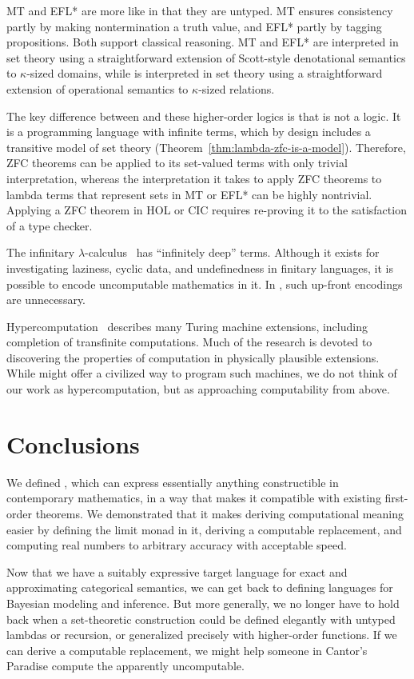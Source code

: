 MT and EFL* are more like \targetlang in that they are untyped. MT ensures consistency partly by making nontermination a truth value, and EFL* partly by tagging propositions.
Both support classical reasoning.
MT and EFL* are interpreted in set theory using a straightforward extension of Scott-style denotational semantics to $\kappa$-sized domains, while \targetlang is interpreted in set theory using a straightforward extension of operational semantics to $\kappa$-sized relations.

The key difference between \targetlang and these higher-order logics is that \targetlang is not a logic. It is a programming language with infinite terms, which by design includes a transitive model of set theory (Theorem~\ref{thm:lambda-zfc-is-a-model}). Therefore, ZFC theorems can be applied to its set-valued terms with only trivial interpretation, whereas the interpretation it takes to apply ZFC theorems to lambda terms that represent sets in MT or EFL* can be highly nontrivial. Applying a ZFC theorem in HOL or CIC requires re-proving it to the satisfaction of a type checker.

The infinitary $\lambda$-calculus~\cite{cit:kennaway-1996-inf-lc} has ``infinitely deep'' terms. Although it exists for investigating laziness, cyclic data, and undefinedness in finitary languages, it is possible to encode uncomputable mathematics in it. In \targetlang, such up-front encodings are unnecessary.

Hypercomputation~\cite{cit:ord-2006-hypercomp} describes many Turing machine extensions, including completion of transfinite computations. Much of the research is devoted to discovering the properties of computation in physically plausible extensions. While \targetlang might offer a civilized way to program such machines, we do not think of our work as hypercomputation, but as approaching computability from above.


\section{Conclusions}

We defined \targetlang, which can express essentially anything constructible in contemporary mathematics, in a way that makes it compatible with existing first-order theorems. We demonstrated that it makes deriving computational meaning easier by defining the limit monad in it, deriving a computable replacement, and computing real numbers to arbitrary accuracy with acceptable speed.

Now that we have a suitably expressive target language for exact and approximating categorical semantics, we can get back to defining languages for Bayesian modeling and inference. But more generally, we no longer have to hold back when a set-theoretic construction could be defined elegantly with untyped lambdas or recursion, or generalized precisely with higher-order functions. If we can derive a computable replacement, we might help someone in Cantor's Paradise compute the apparently uncomputable.

